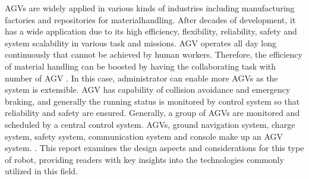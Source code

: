 \documentclass[main]{subfiles}
\begin{document}
AGVs are widely applied in various kinds
of industries including manufacturing
factories and repositories for materialhandling.
After decades of development, it
has a wide application due to its high
efficiency, flexibility, reliability, safety and
system scalability in various task and
missions.
AGV operates all day long continuously
that cannot be achieved by human workers.
Therefore, the efficiency of material
handling can be boosted by having the
collaborating task with number of AGV
. In this case, administrator can enable
more AGVs as the system is extensible.
AGV has capability of collision avoidance
and emergency braking, and generally the
running status is monitored by control
system so that reliability and safety are
ensured. Generally, a group of AGVs are
monitored and scheduled by a central
control system. AGVs, ground navigation
system, charge system, safety system,
communication system and console make
up an AGV system. \cite{shengfang2006research}. This report examines the design aspects and considerations for this type of robot, providing readers with key insights into the technologies commonly utilized in this field. 



\end{document}

